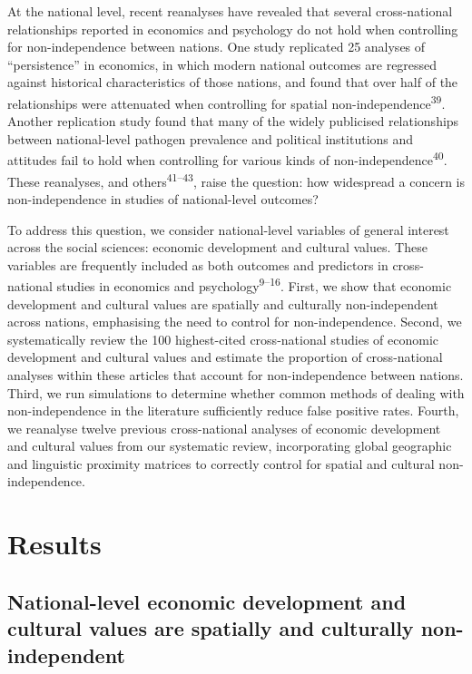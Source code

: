 \documentclass[english,man,floatsintext]{apa6}
\begin{document}
At the national level, recent reanalyses have revealed that several cross-national relationships reported in economics and psychology do not hold when controlling for non-independence between nations. One study replicated 25 analyses of \enquote{persistence} in economics, in which modern national outcomes are regressed against historical characteristics of those nations, and found that over half of the relationships were attenuated when controlling for spatial non-independence\textsuperscript{39}. Another replication study found that many of the widely publicised relationships between national-level pathogen prevalence and political institutions and attitudes fail to hold when controlling for various kinds of non-independence\textsuperscript{40}. These reanalyses, and others\textsuperscript{41--43}, raise the question: how widespread a concern is non-independence in studies of national-level outcomes?

To address this question, we consider national-level variables of general interest across the social sciences: economic development and cultural values. These variables are frequently included as both outcomes and predictors in cross-national studies in economics and psychology\textsuperscript{9--16}. First, we show that economic development and cultural values are spatially and culturally non-independent across nations, emphasising the need to control for non-independence. Second, we systematically review the 100 highest-cited cross-national studies of economic development and cultural values and estimate the proportion of cross-national analyses within these articles that account for non-independence between nations. Third, we run simulations to determine whether common methods of dealing with non-independence in the literature sufficiently reduce false positive rates. Fourth, we reanalyse twelve previous cross-national analyses of economic development and cultural values from our systematic review, incorporating global geographic and linguistic proximity matrices to correctly control for spatial and cultural non-independence.

\hypertarget{results}{%
\section{Results}\label{results}}

\hypertarget{national-level-economic-development-and-cultural-values-are-spatially-and-culturally-non-independent}{%
\subsection{National-level economic development and cultural values are spatially and culturally non-independent}\label{national-level-economic-development-and-cultural-values-are-spatially-and-culturally-non-independent}}
\end{document}
